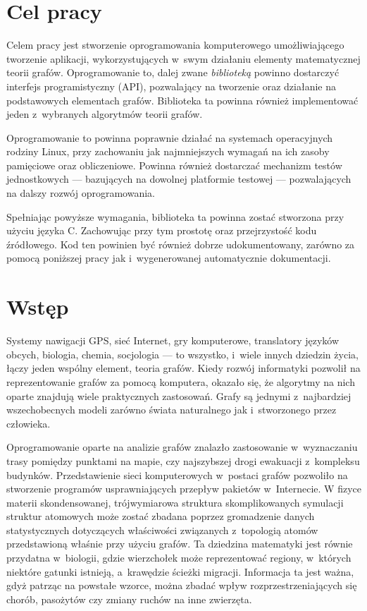 \documentclass[a4paper,12pt,polish,oneside]{thesis}
\begin{document}
\stronaTytulowa

\tableofcontents

\chapter*{Cel pracy}

Celem pracy jest stworzenie oprogramowania komputerowego umożliwiającego tworzenie aplikacji, wykorzystujących w~swym działaniu elementy matematycznej teorii grafów.
Oprogramowanie to, dalej zwane \emph{biblioteką} powinno dostarczyć interfejs programistyczny (API), pozwalający na tworzenie oraz działanie na podstawowych elementach grafów.
Biblioteka ta powinna również implementować jeden z~wybranych algorytmów teorii grafów.

Oprogramowanie to powinna poprawnie działać na systemach operacyjnych rodziny Linux, przy zachowaniu jak najmniejszych wymagań na ich zasoby pamięciowe oraz obliczeniowe.
Powinna również dostarczać mechanizm testów jednostkowych --- bazujących na dowolnej platformie testowej --- pozwalających na dalszy rozwój oprogramowania.

Spełniając powyższe wymagania, biblioteka ta powinna zostać stworzona przy użyciu języka C. Zachowując przy tym prostotę oraz przejrzystość kodu źródłowego.
Kod ten powinien być również dobrze udokumentowany, zarówno za pomocą poniższej pracy jak i~wygenerowanej automatycznie dokumentacji.

\chapter*{Wstęp}

Systemy nawigacji GPS, sieć Internet, gry komputerowe, translatory języków obcych, biologia, chemia, socjologia --- to wszystko, i~wiele innych dziedzin życia, łączy jeden wspólny element, teoria grafów.
Kiedy rozwój informatyki pozwolił na reprezentowanie grafów za pomocą komputera, okazało się, że algorytmy na nich oparte znajdują wiele praktycznych zastosowań.
Grafy są jednymi z~najbardziej wszechobecnych modeli zarówno świata naturalnego jak i~stworzonego przez człowieka.

Oprogramowanie oparte na analizie grafów znalazło zastosowanie w~wyznaczaniu trasy pomiędzy punktami na mapie, czy najszybszej drogi ewakuacji z~kompleksu budynków.
Przedstawienie sieci komputerowych w~postaci grafów pozwoliło na stworzenie programów usprawniających przepływ pakietów w~Internecie.
W fizyce materii skondensowanej, trójwymiarowa struktura skomplikowanych symulacji struktur atomowych może zostać zbadana poprzez gromadzenie danych statystycznych dotyczących właściwości związanych z~topologią atomów przedstawioną właśnie przy użyciu grafów.
Ta dziedzina matematyki jest równie przydatna w~biologii, gdzie wierzchołek może reprezentować regiony, w~których niektóre gatunki istnieją, a~krawędzie ścieżki migracji. Informacja ta jest ważna, gdyż patrząc na powstałe wzorce, można zbadać wpływ rozprzestrzeniających się chorób, pasożytów czy zmiany ruchów na inne zwierzęta.
\end{document}
